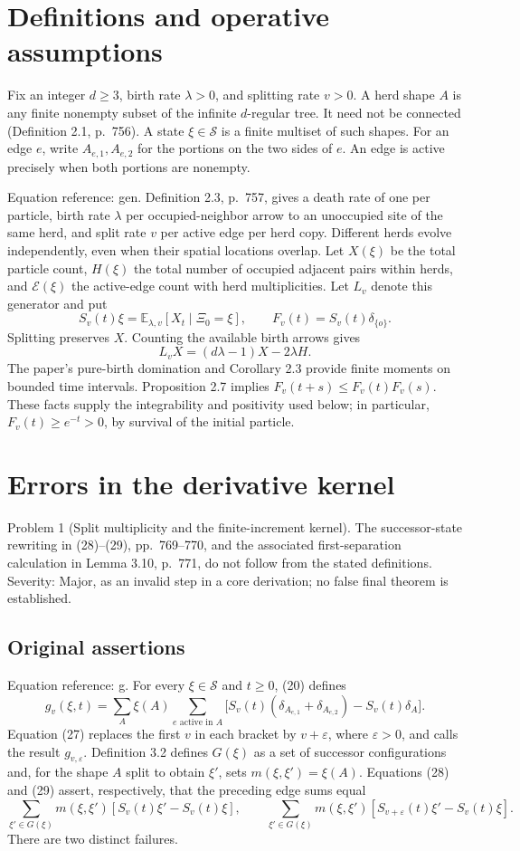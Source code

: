 \documentclass[10pt]{article}
\begin{document}
\section*{Definitions and operative assumptions}
Fix an integer \(d\geq3\), birth rate \(\lambda>0\), and splitting rate \(v>0\). A herd shape \(A\) is any finite nonempty subset of the infinite \(d\)-regular tree. It need not be connected (Definition 2.1, p. 756). A state \(\xi\in\mathcal S\) is a finite multiset of such shapes. For an edge \(e\), write \(A_{e,1},A_{e,2}\) for the portions on the two sides of \(e\). An edge is active precisely when both portions are nonempty.\par
Equation reference: gen. Definition 2.3, p. 757, gives a death rate of one per particle, birth rate \(\lambda\) per occupied-neighbor arrow to an unoccupied site of the same herd, and split rate \(v\) per active edge per herd copy. Different herds evolve independently, even when their spatial locations overlap. Let \(X(\xi)\) be the total particle count, \(H(\xi)\) the total number of occupied adjacent pairs within herds, and \(\mathcal E(\xi)\) the active-edge count with herd multiplicities. Let \(L_v\) denote this generator and put \[S_v(t)\xi=\mathbb E_{\lambda,v}[X_t\mid\Xi_0=\xi],
 \qquad F_v(t)=S_v(t)\delta_{\{o\}}.\] Splitting preserves \(X\). Counting the available birth arrows gives \[
 L_vX=(d\lambda-1)X-2\lambda H .\] The paper’s pure-birth domination and Corollary 2.3 provide finite moments on bounded time intervals. Proposition 2.7 implies \(F_v(t+s)\leq F_v(t)F_v(s)\). These facts supply the integrability and positivity used below; in particular, \(F_v(t)\geq e^{-t}>0\), by survival of the initial particle.\par
\section*{Errors in the derivative kernel}
Problem 1 (Split multiplicity and the finite-increment kernel).  The successor-state rewriting in (28)–(29), pp. 769–770, and the associated first-separation calculation in Lemma 3.10, p. 771, do not follow from the stated definitions. Severity: Major, as an invalid step in a core derivation; no false final theorem is established.\par
\subsection*{Original assertions}
Equation reference: g. For every \(\xi\in\mathcal S\) and \(t\geq0\), (20) defines \[
 g_v(\xi,t)=\sum_A\xi(A)\sum_{e\text{ active in }A}
 \bigl[S_v(t)(\delta_{A_{e,1}}+\delta_{A_{e,2}})
                  -S_v(t)\delta_A\bigr].\] Equation (27) replaces the first \(v\) in each bracket by \(v+\varepsilon\), where \(\varepsilon>0\), and calls the result \(g_{v,\varepsilon}\). Definition 3.2 defines \(G(\xi)\) as a set of successor configurations and, for the shape \(A\) split to obtain \(\xi'\), sets \(m(\xi,\xi')=\xi(A)\). Equations (28) and (29) assert, respectively, that the preceding edge sums equal \[\sum_{\xi'\in G(\xi)}m(\xi,\xi')
       [S_v(t)\xi'-S_v(t)\xi],\qquad
 \sum_{\xi'\in G(\xi)}m(\xi,\xi')
       [S_{v+\varepsilon}(t)\xi'-S_v(t)\xi].\] There are two distinct failures.\par
\end{document}

